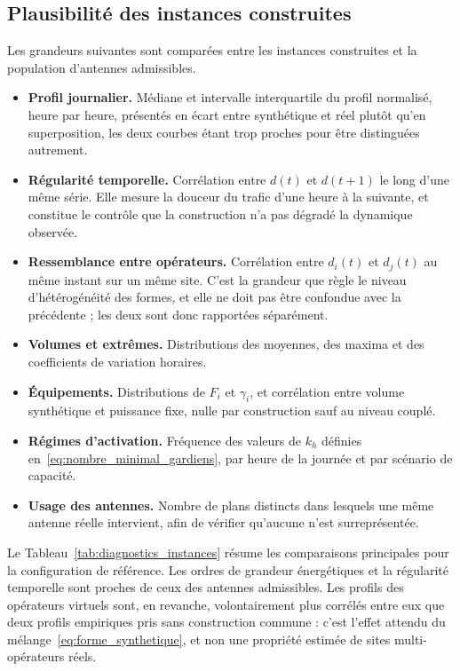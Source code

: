 \subsection{Plausibilité des instances construites}

Les grandeurs suivantes sont comparées entre les instances construites et la
population d'antennes admissibles.

\begin{itemize}
    \item \textbf{Profil journalier.} Médiane et intervalle interquartile du
    profil normalisé, heure par heure, présentés en écart entre synthétique et
    réel plutôt qu'en superposition, les deux courbes étant trop proches pour
    être distinguées autrement.

    \item \textbf{Régularité temporelle.} Corrélation entre \(d(t)\) et
    \(d(t+1)\) le long d'une même série. Elle mesure la douceur du trafic
    d'une heure à la suivante, et constitue le contrôle que la construction
    n'a pas dégradé la dynamique observée.

    \item \textbf{Ressemblance entre opérateurs.} Corrélation entre
    \(d_i(t)\) et \(d_j(t)\) au même instant sur un même site. C'est la
    grandeur que règle le niveau d'hétérogénéité des formes, et elle ne doit
    pas être confondue avec la précédente ; les deux sont donc rapportées
    séparément.

    \item \textbf{Volumes et extrêmes.} Distributions des moyennes, des
    maxima et des coefficients de variation horaires.

    \item \textbf{Équipements.} Distributions de \(F_i\) et \(\gamma_i\), et
    corrélation entre volume synthétique et puissance fixe, nulle par
    construction sauf au niveau couplé.

    \item \textbf{Régimes d'activation.} Fréquence des valeurs de \(k_h\)
    définies en~\eqref{eq:nombre_minimal_gardiens}, par heure de la journée et
    par scénario de capacité.

    \item \textbf{Usage des antennes.} Nombre de plans distincts dans lesquels
    une même antenne réelle intervient, afin de vérifier qu'aucune n'est
    surreprésentée.
\end{itemize}

Le Tableau~\ref{tab:diagnostics_instances} résume les comparaisons principales
pour la configuration de référence. Les ordres de grandeur énergétiques et la
régularité temporelle sont proches de ceux des antennes admissibles. Les
profils des opérateurs virtuels sont, en revanche, volontairement plus
corrélés entre eux que deux profils empiriques pris sans construction commune :
c'est l'effet attendu du mélange~\eqref{eq:forme_synthetique}, et non une
propriété estimée de sites multi-opérateurs réels.

